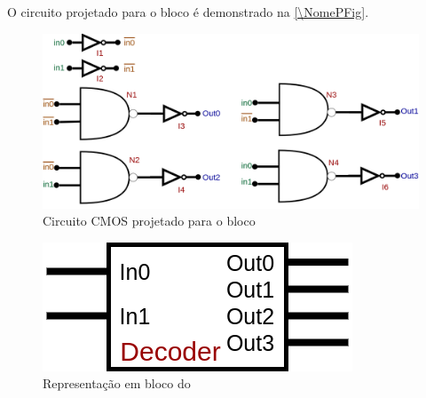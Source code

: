 O circuito projetado para o bloco \'e demonstrado na \autoref{\NomePFig}.

\begin{figure}[htbp]
 \label{NomePFig}
 \centering
    \centering
    \caption{Circuito CMOS projetado para o bloco \NomeBloco} \label{\NomePFig}
    \includegraphics[scale=0.3]{Circuitos/decoder.png}
\end{figure}

\begin{figure}[htbp]
 \label{NomeSFig}
 \centering
    \centering
    \caption{Representa{\c c}\~ao em bloco do \NomeBloco} \label{NomeSFig}
    \includegraphics[scale=0.5]{Circuitos/decoder_block.png}
\end{figure}
\clearpage